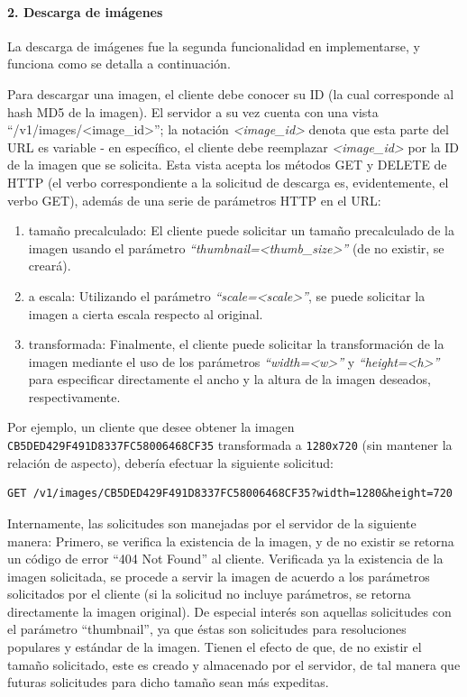 \documentclass[11pt,letterpaper]{article}
\begin{document}
\paragraph{2. Descarga de imágenes}

La descarga de imágenes fue la segunda funcionalidad en implementarse, y funciona como se detalla a continuación.

Para descargar una imagen, el cliente debe conocer su ID (la cual corresponde al hash MD5 de la imagen). El servidor a su vez cuenta con una vista ``/v1/images/\textless image\_id\textgreater''; la notación \emph{\textless image\_id\textgreater} denota que esta parte del URL es variable - en específico, el cliente debe reemplazar \emph{\textless image\_id\textgreater} por la ID de la imagen que se solicita. Esta vista acepta los métodos GET y DELETE de HTTP (el verbo correspondiente a la solicitud de descarga es, evidentemente, el verbo GET), además de una serie de parámetros HTTP en el URL:
\begin{enumerate}
    \item tamaño precalculado: El cliente puede solicitar un tamaño precalculado de la imagen usando el parámetro \emph{``thumbnail=\textless thumb\_size\textgreater''} (de no existir, se creará).
    \item a escala: Utilizando el parámetro \emph{``scale=\textless scale\textgreater''}, se puede solicitar la imagen a cierta escala respecto al original.
    \item transformada: Finalmente, el cliente puede solicitar la transformación de la imagen mediante el uso de los parámetros \emph{``width=\textless w\textgreater''} y \emph{``height=\textless h\textgreater''} para especificar directamente el ancho y la altura de la imagen deseados, respectivamente.
\end{enumerate}

Por ejemplo, un cliente que desee obtener la imagen \texttt{CB5DED429F491D8337FC58006468CF35} transformada a \texttt{1280x720} (sin mantener la relación de aspecto), debería efectuar la siguiente solicitud:
\begin{verbatim}
GET /v1/images/CB5DED429F491D8337FC58006468CF35?width=1280&height=720
\end{verbatim}

Internamente, las solicitudes son manejadas por el servidor de la siguiente manera:
Primero, se verifica la existencia de la imagen, y de no existir se retorna un código de error ``404 Not Found'' al cliente.
Verificada ya la existencia de la imagen solicitada, se procede a servir la imagen de acuerdo a los parámetros solicitados por el cliente (si la solicitud no incluye parámetros, se retorna directamente la imagen original). De especial interés son aquellas solicitudes con el parámetro ``thumbnail'', ya que éstas son solicitudes para resoluciones populares y estándar de la imagen. Tienen el efecto de que, de no existir el tamaño solicitado, este es creado y almacenado por el servidor, de tal manera que futuras solicitudes para dicho tamaño sean más expeditas.\\
\end{document}
